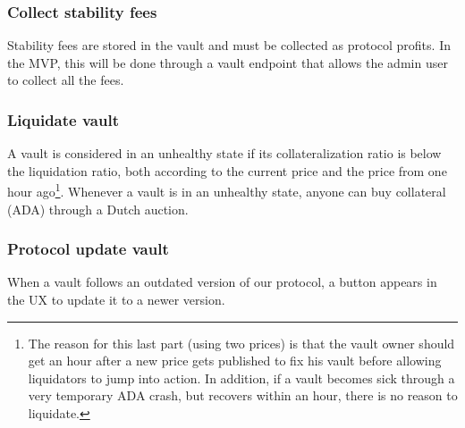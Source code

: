 \documentclass{article} %
\begin{document}
\subsubsection*{Collect stability fees}

Stability fees are stored in the vault and must be collected as protocol
profits. In the MVP, this will be done through a vault endpoint that allows the
admin user to collect all the fees. \\


\subsubsection*{Liquidate vault}

A vault is considered in an unhealthy state if its collateralization ratio is
below the liquidation ratio, both according to the current price and the price
from one hour ago\footnote{
  The reason for this last part (using two prices) is that the vault owner
  should get an hour after a new price gets published to fix his vault before
  allowing liquidators to jump into action. In addition, if a vault becomes sick
  through a very temporary ADA crash, but recovers within an hour, there is no
  reason to liquidate.}.
Whenever a vault is in an unhealthy state, anyone can buy collateral (ADA)
through a Dutch auction.

\subsubsection*{Protocol update vault}

When a vault follows an outdated version of our protocol, a button appears in
the UX to update it to a newer version.
\end{document}
